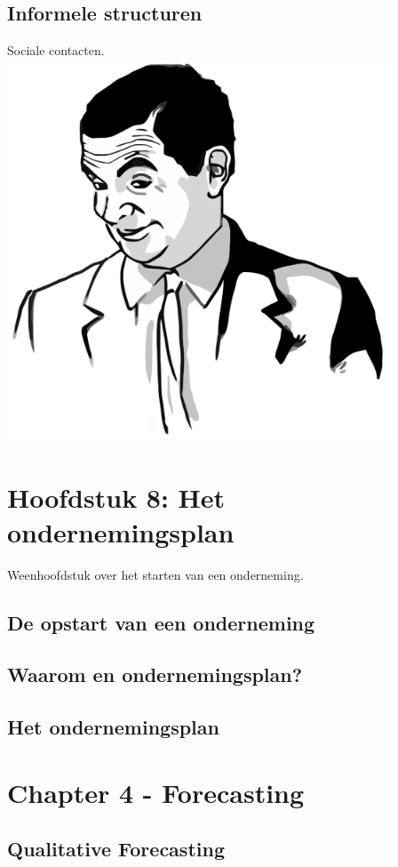 \documentclass[12pt]{article}
\begin{document}
\subsection{Informele structuren}
Sociale contacten. \includegraphics[scale=0.1]{IfYouKnowWhatIMean.png}
\clearpage
\section{Hoofdstuk 8: Het ondernemingsplan}
Weenhoofdstuk over het starten van een onderneming.
\subsection{De opstart van een onderneming}
\subsection{Waarom en ondernemingsplan?}
\subsection{Het ondernemingsplan}
\clearpage
\section{Chapter 4 - Forecasting}
\setcounter{subsection}{2}
\subsection{Qualitative Forecasting}
\setcounter{subsubsection}{1}
\end{document}

